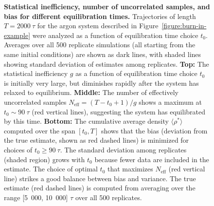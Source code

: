 \documentclass[aps,pre,twocolumn,nofootinbib,superscriptaddress,linenumbers,11point]{revtex4-1}
\newcommand{\expect}[1]{\langle #1 \rangle}                %
\begin{document}
\begin{figure}[tbp]
\caption{\label{figure:reverse-cumulative-average} {\bf Statistical inefficiency, number of uncorrelated samples, and bias for different equilibration times.} 
Trajectories of length $T = 2000~\tau$ for the argon system described in Figure~\ref{figure:burn-in-example} were analyzed as a function of equilibration time choice $t_0$.
Averages over all 500 replicate simulations (all starting from the same initial conditions) are shown as dark lines, with shaded lines showing standard deviation of estimates among replicates.
{\bf Top:} The statistical inefficiency $g$ as a function of equilibration time choice $t_0$ is initially very large, but diminishes rapidly after the system has relaxed to equilibrium.
{\bf Middle:} The number of effectively uncorrelated samples $N_\mathrm{eff} = (T - t_0 + 1) / g$ shows a maximum at $t_0 \sim 90~\tau$ (red vertical lines), suggesting the system has equilibrated by this time.
{\bf Bottom:} The cumulative average density $\expect{\rho^*}$ computed over the span $[t_0, T]$ shows that the bias (deviation from the true estimate, shown as red dashed lines) is minimized for choices of $t_0 \ge 90~\tau$.
The standard deviation among replicates (shaded region) grows with $t_0$ because fewer data are included in the estimate.
The choice of optimal $t_0$ that maximizes $N_\mathrm{eff}$ (red vertical line) strikes a good balance between bias and variance.
The true estimate (red dashed lines) is computed from averaging over the range [5~000, 10~000] $\tau$ over all 500 replicates.
}
\end{figure}

\end{document}
